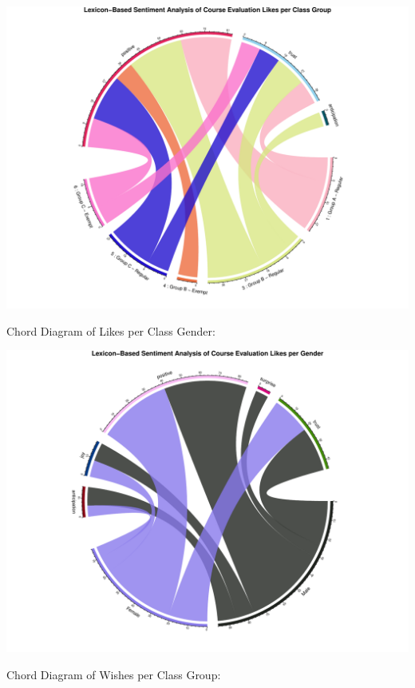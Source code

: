 \documentclass[
]{article}
\begin{document}
\includegraphics{AnalysisOfCourseEvaluation-Notebook_files/figure-latex/ChordDiagramLikesPerGroup-1.pdf}

\newpage

Chord Diagram of Likes per Class Gender:

\includegraphics{AnalysisOfCourseEvaluation-Notebook_files/figure-latex/ChordDiagramLikesPerGender-1.pdf}

\newpage

Chord Diagram of Wishes per Class Group:
\end{document}

